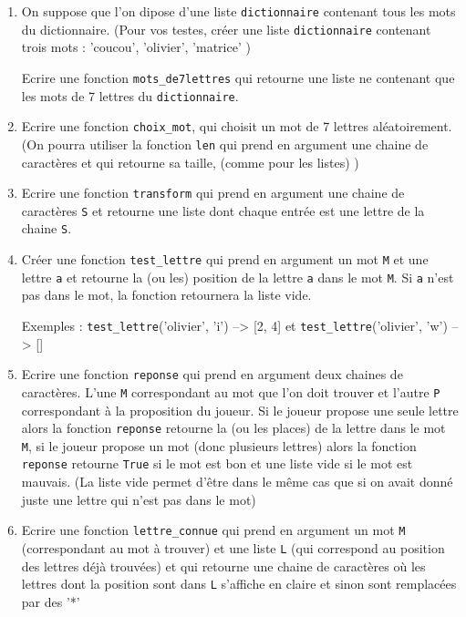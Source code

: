 \documentclass[a4paper, 11pt,reqno]{article}
\begin{document}
\begin{exercice}


\begin{enumerate}
\item On suppose que l'on dipose d'une liste \texttt{dictionnaire} contenant tous les mots du dictionnaire. (Pour vos testes, créer une liste  \texttt{dictionnaire} contenant trois mots : 'coucou', 'olivier', 'matrice' )

Ecrire une fonction \texttt{mots\_de7lettres} qui retourne une liste ne contenant que les mots de 7 lettres du \texttt{dictionnaire}.

\item Ecrire une fonction \texttt{choix\_mot}, qui choisit un mot de 7 lettres aléatoirement.
(On pourra utiliser la fonction \texttt{len} qui prend en argument une chaine de caractères et qui retourne sa taille, (comme pour les listes) ) 

\item Ecrire une fonction \texttt{transform} qui prend en argument une chaine de caractères \texttt{S} et retourne une liste dont chaque entrée est une lettre de la chaine \texttt{S}.

\item Créer une fonction \texttt{test\_lettre} qui prend en argument un mot \texttt{M} et une lettre \texttt{a} et retourne la (ou les) position de la lettre \texttt{a} dans le mot \texttt{M}. Si \texttt{a} n'est pas dans le mot, la fonction retournera la liste vide. 

Exemples : \texttt{test\_lettre}('olivier', 'i') --> [2, 4] et \texttt{test\_lettre}('olivier', 'w') --> []

\item Ecrire une fonction  \texttt{reponse} qui prend en argument deux chaines de caractères. L'une \texttt{M} correspondant au mot que l'on doit trouver et l'autre \texttt{P} correspondant à la proposition du joueur. Si le joueur propose une seule lettre alors  la fonction \texttt{reponse}  retourne la (ou les places) de la lettre dans le mot \texttt{M}, si le joueur propose un mot (donc plusieurs lettres) alors la fonction \texttt{reponse} retourne \texttt{True} si le mot est bon et une liste vide si le mot est mauvais. (La liste vide permet d'être dans le même cas que si on avait donné juste une lettre qui n'est pas dans le mot) 

\item Ecrire une fonction \texttt{lettre\_connue} qui prend en argument un mot \texttt{M}  (correspondant au mot à trouver) et une liste \texttt{L}  (qui correspond au position des lettres déjà trouvées) et qui retourne une chaine de caractères où les lettres dont la position sont dans \texttt{L} s'affiche en claire et sinon sont remplacées par des '*'


\end{enumerate}
\end{exercice}
\end{document}
